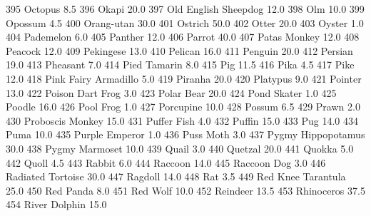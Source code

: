 \documentclass[a4paper]{article}
\begin{document}
\begin{Schunk}
\begin{Soutput}
395                        Octopus      8.5
396                          Okapi     20.0
397           Old English Sheepdog     12.0
398                            Olm     10.0
399                        Opossum      4.5
400                     Orang-utan     30.0
401                        Ostrich     50.0
402                          Otter     20.0
403                         Oyster      1.0
404                      Pademelon      6.0
405                        Panther     12.0
406                         Parrot     40.0
407                   Patas Monkey     12.0
408                        Peacock     12.0
409                      Pekingese     13.0
410                        Pelican     16.0
411                        Penguin     20.0
412                        Persian     19.0
413                       Pheasant      7.0
414                   Pied Tamarin      8.0
415                            Pig     11.5
416                           Pika      4.5
417                           Pike     12.0
418           Pink Fairy Armadillo      5.0
419                        Piranha     20.0
420                       Platypus      9.0
421                        Pointer     13.0
422               Poison Dart Frog      3.0
423                     Polar Bear     20.0
424                    Pond Skater      1.0
425                         Poodle     16.0
426                      Pool Frog      1.0
427                      Porcupine     10.0
428                         Possum      6.5
429                          Prawn      2.0
430               Proboscis Monkey     15.0
431                    Puffer Fish      4.0
432                         Puffin     15.0
433                            Pug     14.0
434                           Puma     10.0
435                 Purple Emperor      1.0
436                      Puss Moth      3.0
437             Pygmy Hippopotamus     30.0
438                 Pygmy Marmoset     10.0
439                          Quail      3.0
440                        Quetzal     20.0
441                         Quokka      5.0
442                          Quoll      4.5
443                         Rabbit      6.0
444                        Raccoon     14.0
445                    Raccoon Dog      3.0
446              Radiated Tortoise     30.0
447                        Ragdoll     14.0
448                            Rat      3.5
449             Red Knee Tarantula     25.0
450                      Red Panda      8.0
451                       Red Wolf     10.0
452                       Reindeer     13.5
453                     Rhinoceros     37.5
454                  River Dolphin     15.0

\end{Soutput}
\end{Schunk}
\end{document}
